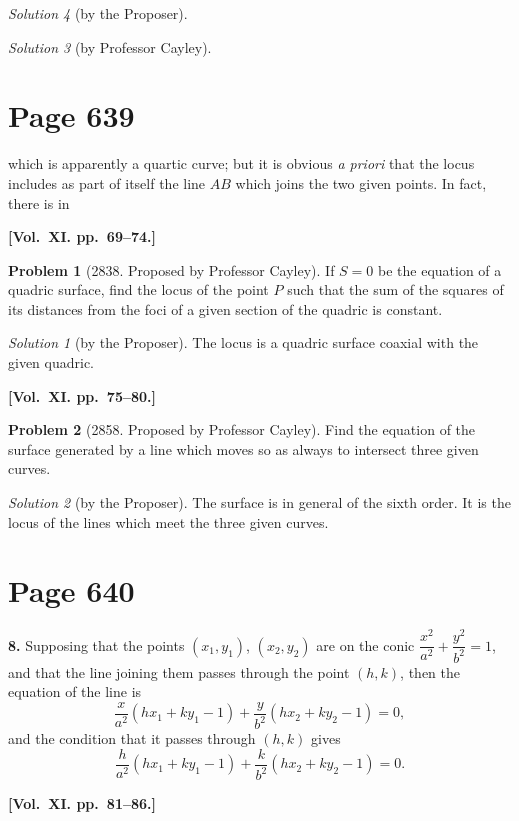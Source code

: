 \documentclass[12pt,a4paper]{article}
\theoremstyle{plain}
\theoremstyle{definition}
\newtheorem{problem}{Problem}
\theoremstyle{remark}
\newtheorem*{solution}{Solution}
\begin{document}
\begin{solution}[by the Proposer]
\begin{solution}[by Professor Cayley]
\section*{Page 639}
\setcounter{page}{639}

which is apparently a quartic curve; but it is obvious \textit{a priori} that the locus includes as part of itself the line $AB$ which joins the two given points. In fact, there is in

\medskip\noindent\textbf{[Vol.~XI. pp.~69--74.]}

\begin{problem}[2838. Proposed by Professor Cayley]
If $S = 0$ be the equation of a quadric surface, find the locus of the point $P$ such that the sum of the squares of its distances from the foci of a given section of the quadric is constant.
\end{problem}

\begin{solution}[by the Proposer]
The locus is a quadric surface coaxial with the given quadric.
\end{solution}

\medskip\noindent\textbf{[Vol.~XI. pp.~75--80.]}

\begin{problem}[2858. Proposed by Professor Cayley]
Find the equation of the surface generated by a line which moves so as always to intersect three given curves.
\end{problem}

\begin{solution}[by the Proposer]
The surface is in general of the sixth order. It is the locus of the lines which meet the three given curves.
\end{solution}

\section*{Page 640}
\setcounter{page}{640}

\textbf{8.} Supposing that the points $(x_1, y_1)$, $(x_2, y_2)$ are on the conic $\dfrac{x^2}{a^2} + \dfrac{y^2}{b^2} = 1$, and that the line joining them passes through the point $(h, k)$, then the equation of the line is
\[
\frac{x}{a^2}(hx_1 + ky_1 - 1) + \frac{y}{b^2}(hx_2 + ky_2 - 1) = 0,
\]
and the condition that it passes through $(h, k)$ gives
\[
\frac{h}{a^2}(hx_1 + ky_1 - 1) + \frac{k}{b^2}(hx_2 + ky_2 - 1) = 0.
\]

\medskip\noindent\textbf{[Vol.~XI. pp.~81--86.]}


\end{solution}
\end{solution}
\end{document}
